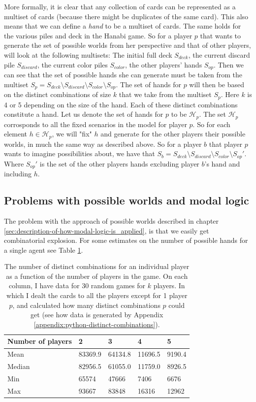 More formally, it is clear that any collection of cards can be represented as a multiset of cards (because there might be duplicates of the same card). This also means that we can define a \emph{hand} to be a multiset of cards. The same holds for the various piles and deck in the Hanabi game.  
So for a player $p$ that wants to generate the set of possible worlds from her perspective and that of other players, will look at the following multisets:
The initial full deck $S_{deck}$, the current discard pile $S_{discard}$, the current color piles $S_{color}$, the other players' hands $S_{op}$. 
Then we can see that the set of possible hands she can generate must be taken from the multiset $S_{p} = S_{deck} \setminus S_{discard} \setminus S_{color} \setminus S_{op}$. 
The set of hands for $p$ will then be based on the distinct combinations of size $k$ that we take from the multiset $S_{p}$.
Here $k$ is 4 or 5 depending on the size of the hand.
Each of these distinct combinations constitute a hand.
Let us denote the set of hands for $p$ to be $\mathcal{H}_p$. The set $\mathcal{H}_p$ corrosponds to all the fixed scenarios in the model for player $p$.
So for each element $h \in \mathcal{H}_p$, we will "fix" $h$ and generate for the other players their possible worlds, in much the same way as described above. So for a player $b$ that player $p$ wants to imagine possibilities about, we have that $S_{b} = S_{deck} \setminus S_{discard} \setminus S_{color} \setminus S_{op}'$. Where $S_{op}'$ is the set of the other players hands excluding player $b$'s hand and including $h$. 


\subsection{Problems with possible worlds and modal logic}
The problem with the approach of possible worlds described in chapter \ref{sec:description-of-how-modal-logic-is_applied}, is that we easily get combinatorial explosion. 
For some estimates on the number of possible hands for a single agent see Table \ref{table:combinations}.

\begin{table}
	\centering
\begin{tabular}{l|llll}
Number of players & 2       & 3       & 4       & 5      \\\hline
Mean              & 83369.9 & 64134.8 & 11696.5 & 9190.4 \\
Median            & 82956.5 & 61055.0 & 11759.0 & 8926.5 \\
Min               & 65574   & 47666   & 7406    & 6676   \\
Max               & 93667   & 83848   & 16316   & 12962 
\end{tabular}
	\caption{The number of distinct combinations for an individual player as a function of the number of players in the game. On each column, I have data for 30 random games for $k$ players. In which I dealt the cards to all the players except for 1 player $p$, and calculated how many distinct combinations $p$ could get (see how data is generated by Appendix \ref{appendix:python-distinct-combinations}).}
	\label{table:combinations}
\end{table}


